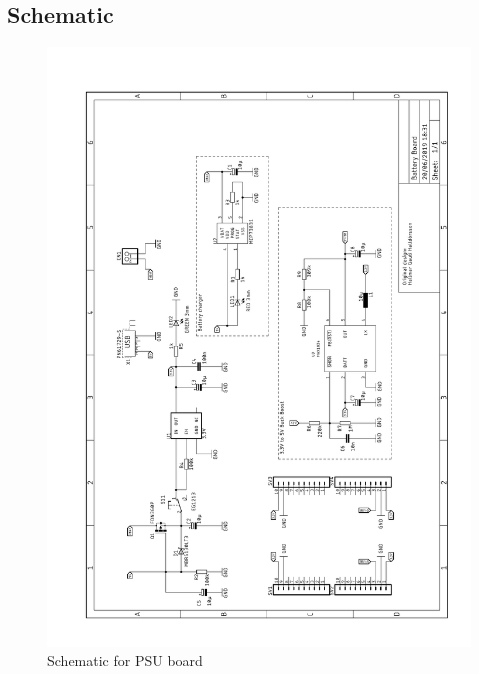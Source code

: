 \documentclass{article}
\begin{document}
  \subsection{Schematic}
     \begin{figure}[H]
  	\centering
  	\includegraphics[width=1\linewidth]{battery-b.pdf}
  	\caption{Schematic for PSU board}
 	 \label{fig:schematic2}
\end{figure}
\end{document}
